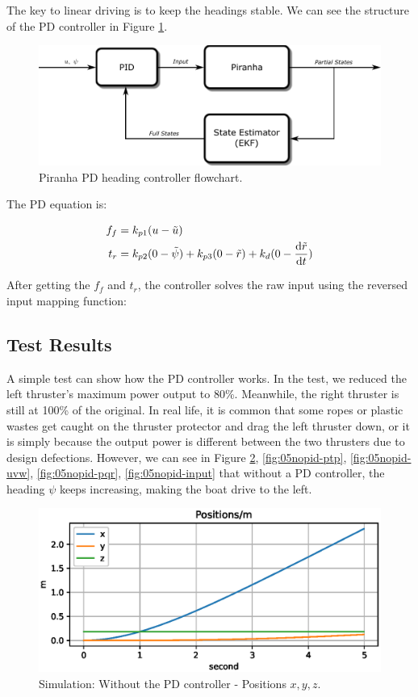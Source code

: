 The key to linear driving is to keep the headings stable. We can see the structure of the PD controller in Figure \ref{fig:05pid-flowchart}.

\begin{figure}[H]
    \centering
    \includegraphics[width=.8\textwidth]{images/05pid-flowchart.pdf}
    \caption{Piranha PD heading controller flowchart.}
    \label{fig:05pid-flowchart}
\end{figure}

The PD equation is:

\begin{align}
    f_f &= k_{p1}(u-\Tilde{u}) \\
    t_r &= k_{p2}(0-\Tilde{\psi})+k_{p3}(0-\Tilde{r})+k_{d}(0- \frac{{\rm d}\Tilde{r}}{{\rm d}t})
\end{align}

After getting the $f_f$ and $t_r$, the controller solves the raw input using the reversed input mapping function:

\subsection{Test Results}

A simple test can show how the PD controller works. In the test, we reduced the left thruster's maximum power output to 80\%. Meanwhile, the right thruster is still at 100\% of the original. In real life, it is common that some ropes or plastic wastes get caught on the thruster protector and drag the left thruster down, or it is simply because the output power is different between the two thrusters due to design defections. However, we can see in Figure \ref{fig:05nopid-xyz}, \ref{fig:05nopid-ptp}, \ref{fig:05nopid-uvw}, \ref{fig:05nopid-pqr}, \ref{fig:05nopid-input} that without a PD controller, the heading $\psi$ keeps increasing, making the boat drive to the left.

\begin{figure}[ht]
    \centering
    \includegraphics[width=.8\textwidth]{images/05nopid-test-xyz.eps}
    \caption{Simulation: Without the PD controller - Positions $x, y, z$.}
    \label{fig:05nopid-xyz}
\end{figure}

